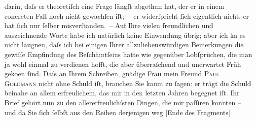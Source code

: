 \begin{ledgroupsized}[t]{13cm}
               darin, daſs er theoretiſch eine Frage längſt abgethan hat, der er in einem concreten
               Fall noch nicht gewachſen iſt; – er widerſpricht ſich eigentlich nicht, er hat ſich
               nur ſelber misverſtanden. – Auf Ihre vielen freundlichen und auszeich{\pb}nende Worte habe ich natürlich keine Einwendung übrig; aber ich ka{\geminationn} es nicht läugnen, daſs ich bei einigen Ihrer
               allzuliebenswürdigen Bemerkungen die gewiſſe Empfindung des Beſchämtſeins hatte wie
               gegenüber Lobſprüchen, die man ja wohl einmal zu verdienen hofft, die aber
               überraſchend und unerwartet Früh geko{\geminationm}en ſind.\pend
           \pstart
           {\pb}Daſs an Ihrem Schreiben, gnädige Frau mein Freund \textsc{Paul Goldmann} nicht ohne Schuld iſt, brauchen Sie kaum zu ſagen: er trägt die Schuld beinahe
               an allem erfreulichem, das mir in den letzten Jahren begegnet iſt. Ihr Brief gehört
               nun zu den allererfreulichſsten Dingen, die mir paſſiren konnten – und da Sie ſich
               ſelbſt aus den Reihen derjenigen weg {[}Ende des Fragments{]}\pend
           \endnumbering{}\end{ledgroupsized}  \newcommand{\dateiname}{L00337}\newcommand{\titel}{Arthur Schnitzler an Lou Andreas-Salomé, 13. 6. 1894}\newcommand{\editorInnen}{Martin Anton Müller und Gerd-Hermann Susen}
      